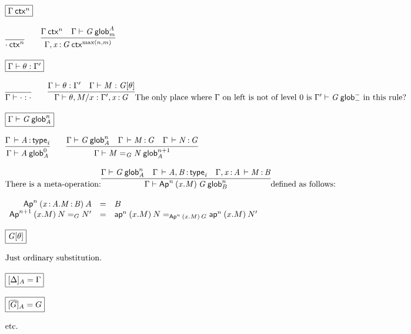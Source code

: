 \begin{small}
\[
\begin{array}{l}
\framebox{\wfctx{\Gamma}{n}} \\ \\

\infer{\wfctx{\cdot}{n}}{}
\qquad
\infer{\wfctx{\Gamma,\tptm{x}{G}}{{\max(n,m)}}}
       {\wfctx{\Gamma}{n} &
        \wfglob{\Gamma}{G}{A}{m}}
\\ \\

\framebox{\wfsub{\Gamma}{\theta}{\Gamma'}} \\ \\

\infer{\wfsub{\Gamma}{\cdot}{\cdot}}{}
\qquad
\infer{\wfsub{\Gamma}{\theta,M/x}{\Gamma',\tptm{x}{G}}}
      {\wfsub{\Gamma}{\theta}{\Gamma'} &
       \ofglob{\Gamma}{M}{\tsubst{G}{\theta}}}
\text{The only place where $\Gamma$ on left is not of level 0 is $\wfglob{\Gamma'}{G}{-}{-}$
  in this rule?}\\ \\


\framebox{\wfglob{\Gamma}{G}{n}{A}} \\ \\

\infer{\wfglob{\Gamma}{A}{0}{A}}
      {\oftp{\Gamma}{A}{\typ{i}}}
\qquad
\infer{\wfglob{\Gamma}{\homj{G}{M}{N}}{n+1}{A}}
      {\wfglob{\Gamma}{G}{n}{A} &
        \oftp{\Gamma}{M}{G} &
        \oftp{\Gamma}{N}{G}
      }
\\ \\

\text{There is a meta-operation:}
\infer{\wfglob{\Gamma}{\Apn{n}{(x.M)}{G}}{n}{B}}
      {\wfglob{\Gamma}{G}{n}{A} &
       \oftp{\Gamma}{A,B}{\typ{i}} & 
       \oftp{\Gamma,\tptm{x}{A}}{M}{B}}
\text{defined as follows:}
\\ \\
\begin{array}{rcl}
\Apn{n}{(\tptm{x}{A}.\tptm{M}{B})}{A} & = & {B} \\
\Apn{n+1}{(x.M)}{\homj{G}{N}{N'}} & = & \homj{\Apn{n}{(x.M)}{G}}{\apn{n}{(x.M)}{N}}{\apn{n}{(x.M)}{N'}} \\
\end{array}

\\ \\

\framebox{\tsubst{G}{\theta}}
\\ \\

\text{Just ordinary substitution.}
\\ \\

\framebox{$\interpdiag{\Delta}{A} = \Gamma$} \\ \\
\framebox{$\interpdiag{\diag{G}}{A} = G$} \\ \\
\text{etc.}

\\ \\
\end{array}
\]
\end{small}

